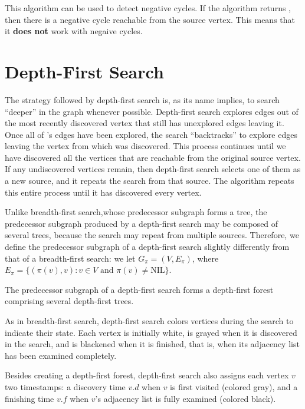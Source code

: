 \vspace{-1em}

\begin{warningblock}
This algorithm can be used to detect negative cycles. If the algorithm returns , then there is a negative cycle reachable from the source vertex.
This means that it \textbf{does not} work with negaive cycles.
\end{warningblock}

\newpage

\section{Depth-First Search}

The strategy followed by depth-first search is, as its name implies, to search “deeper” in the graph whenever possible. Depth-first search explores edges out of the most recently discovered vertex that still has unexplored edges leaving it. Once all of ’s edges have been explored, the search “backtracks” to explore edges leaving the vertex from which was discovered. This process continues until we have discovered all the vertices that are reachable from the original source vertex. If any undiscovered vertices remain, then depth-first search selects one of them as a new source, and it repeats the search from that source. The algorithm repeats this entire process until it has discovered every vertex.

Unlike breadth-first search,whose predecessor subgraph forms a tree, the predecessor subgraph produced by a depth-first search may be composed of several trees, because the search may repeat from multiple sources. Therefore, we define the predecessor subgraph of a depth-first search slightly differently from that of a breadth-first search: we let $G_{\pi} = (V, E_{\pi})$, where $E_{\pi} = \{(\pi(v), v) : v \in V \text{ and } \pi(v) \neq \text{NIL}\}$.

The predecessor subgraph of a depth-first search forms a depth-first forest comprising several depth-first trees.

As in breadth-first search, depth-first search colors vertices during the search to indicate their state. Each vertex is initially white, is grayed when it is discovered in the search, and is blackened when it is finished, that is, when its adjacency list has been examined completely.

Besides creating a depth-first forest, depth-first search also assigns each vertex $v$ two timestamps: a discovery time $v.d$ when $v$ is first visited (colored gray), and a finishing time $v.f$ when $v$'s adjacency list is fully examined (colored black).

